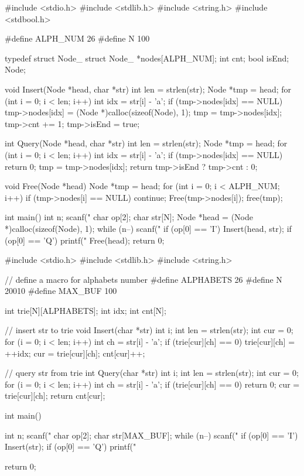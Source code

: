 \begin{mycpptwocol}[链表形式的Trie]
#include <stdio.h>
#include <stdlib.h>
#include <string.h>
#include <stdbool.h>

#define ALPH_NUM 26
#define N 100

typedef struct Node_ {
    struct Node_ *nodes[ALPH_NUM];
    int cnt;
    bool isEnd;
} Node;

void Insert(Node *head, char *str)
{
    int len = strlen(str);
    Node *tmp = head;
    for (int i = 0; i < len; i++) {
        int idx = str[i] - 'a';
        if (tmp->nodes[idx] == NULL) {
            tmp->nodes[idx] = (Node *)calloc(sizeof(Node), 1);
        }
        tmp = tmp->nodes[idx];
    }
    tmp->cnt += 1;
    tmp->isEnd = true;
}

int Query(Node *head, char *str)
{
    int len = strlen(str);
    Node *tmp = head;
    for (int i = 0; i < len; i++) {
        int idx = str[i] - 'a';
        if (tmp->nodes[idx] == NULL) {
            return 0;
        }
        tmp = tmp->nodes[idx];
    }
    return tmp->isEnd ? tmp->cnt : 0;
}

void Free(Node *head) {
    Node *tmp = head;
    for (int i = 0; i < ALPH_NUM; i++) {
        if (tmp->nodes[i] == NULL) {
            continue;
        }
        Free(tmp->nodes[i]);
    }
    free(tmp);
}

int main()
{
    int n;
    scanf("%
    char op[2];
    char str[N];
    Node *head = (Node *)calloc(sizeof(Node), 1);
    while (n--) {
        scanf("%
        if (op[0] == 'I') {
            Insert(head, str);
        }
        if (op[0] == 'Q') {
            printf("%
        }
    }
    Free(head);
    return 0;
}
\end{mycpptwocol}

\begin{mycpptwocol}[数组模拟Trie]
#include <stdio.h>
#include <stdlib.h>
#include <string.h>

// define a macro for alphabets number
#define ALPHABETS 26
#define N 20010
#define MAX_BUF 100

int trie[N][ALPHABETS];
int idx;
int cnt[N];

// insert str to trie
void Insert(char *str) {
    int i;
    int len = strlen(str);
    int cur = 0;
    for (i = 0; i < len; i++) {
        int ch = str[i] - 'a';
        if (trie[cur][ch] == 0) {
            trie[cur][ch] = ++idx;
        }
        cur = trie[cur][ch];
    }
    cnt[cur]++;
}

// query str from trie
int Query(char *str) {
    int i;
    int len = strlen(str);
    int cur = 0;
    for (i = 0; i < len; i++) {
        int ch = str[i] - 'a';
        if (trie[cur][ch] == 0) {
            return 0;
        }
        cur = trie[cur][ch];
    }
    return cnt[cur];
}

int main()
{
    int n;
    scanf("%
    char op[2];
    char str[MAX_BUF];
    while (n--) {
        scanf("%
        if (op[0] == 'I') {
            Insert(str);
        }
        if (op[0] == 'Q') {
            printf("%
        }
    }
    
    return 0;
}
\end{mycpptwocol}

